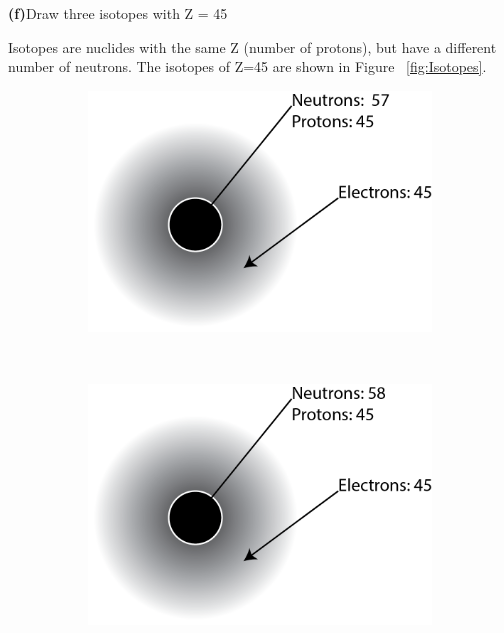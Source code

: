 \documentclass[11pt]{article}
\renewcommand{\part}[1] {\vspace{.10in} {\bf (#1)}}
\begin{document}
\part{f}{Draw three isotopes with Z = 45}

Isotopes are nuclides with the same Z (number of protons), but have a different number of neutrons.
The isotopes of Z=45 are shown in Figure ~\ref{fig:Isotopes}.
\begin{figure}[!ht]
	\centering
	\begin{subfigure}[b]{0.3\textwidth}
		\centering
		\includegraphics[width=\textwidth]{HW2_102Rh.png}
	\end{subfigure}%
	~
	\begin{subfigure}[b]{0.3\textwidth}
		\centering
		\includegraphics[width=\textwidth]{HW2_103Rh.png}

\end{subfigure}
\end{figure}
\end{document}
